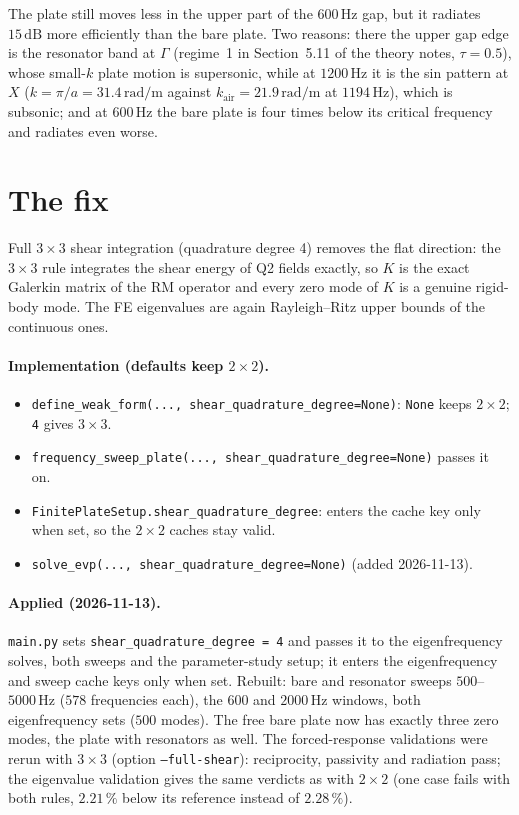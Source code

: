 \documentclass[11pt]{article}
\begin{document}
The plate still moves less in the upper part of the $600\,\mathrm{Hz}$ gap, but it
radiates $15\,\mathrm{dB}$ more efficiently than the bare plate. Two reasons: there the
upper gap edge is the resonator band at $\Gamma$ (regime~1 in Section~5.11 of the theory notes, $\tau = 0.5$), whose small-$k$ plate motion is
supersonic, while at $1200\,\mathrm{Hz}$ it is the sin pattern at $X$
($k = \pi/a = 31.4\,\mathrm{rad/m}$ against $k_\mathrm{air} = 21.9\,\mathrm{rad/m}$ at
$1194\,\mathrm{Hz}$), which is subsonic; and at $600\,\mathrm{Hz}$ the bare plate is
four times below its critical frequency and radiates even worse.

\section{The fix}

Full $3\times 3$ shear integration (quadrature degree 4) removes the flat direction:
the $3\times 3$ rule integrates the shear energy of Q2 fields exactly, so $K$ is the
exact Galerkin matrix of the RM operator and every zero mode of $K$ is a genuine
rigid-body mode. The FE eigenvalues are again Rayleigh--Ritz upper bounds of the
continuous ones.

\paragraph{Implementation (defaults keep $2\times 2$).}
\begin{itemize}
  \item \texttt{define\_weak\_form(..., shear\_quadrature\_degree=None)}: \texttt{None}
        keeps $2\times 2$; \texttt{4} gives $3\times 3$.
  \item \texttt{frequency\_sweep\_plate(..., shear\_quadrature\_degree=None)} passes it on.
  \item \texttt{FinitePlateSetup.shear\_quadrature\_degree}: enters the cache key only
        when set, so the $2\times 2$ caches stay valid.
  \item \texttt{solve\_evp(..., shear\_quadrature\_degree=None)} (added 2026-11-13).
\end{itemize}
\paragraph{Applied (2026-11-13).} \texttt{main.py} sets
\texttt{shear\_quadrature\_degree = 4} and passes it to the eigenfrequency solves, both
sweeps and the parameter-study setup; it enters the eigenfrequency and sweep cache keys
only when set. Rebuilt: bare and resonator sweeps $500$--$5000\,\mathrm{Hz}$
($578$ frequencies each), the $600$ and $2000\,\mathrm{Hz}$ windows, both eigenfrequency
sets ($500$ modes). The free bare plate now has exactly three zero modes, the plate
with resonators as well. The forced-response validations were rerun with $3\times 3$
(option \texttt{--full-shear}): reciprocity, passivity and radiation pass; the
eigenvalue validation gives the same verdicts as with $2\times 2$ (one case fails with
both rules, $2.21\,\%$ below its reference instead of $2.28\,\%$).
\end{document}
